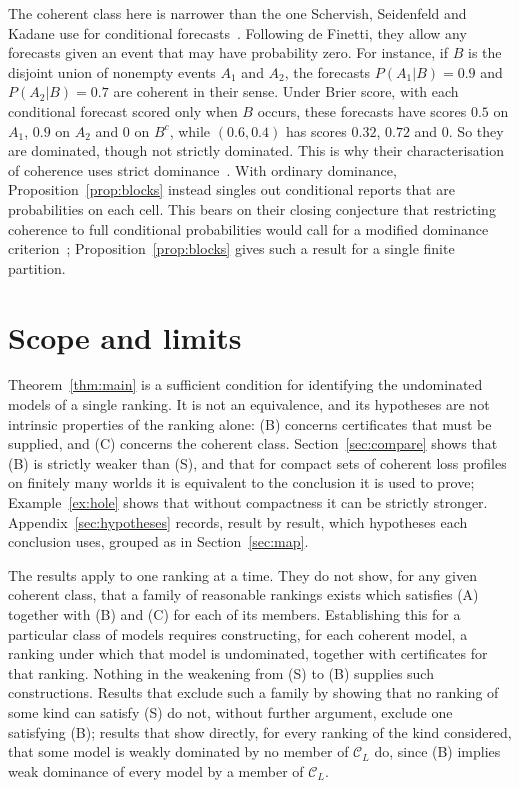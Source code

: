 \documentclass[11pt]{article}
\theoremstyle{definition}
\theoremstyle{remark}
\newcommand{\C}{\mathcal C}
\begin{document}
The coherent class here is narrower than the one Schervish, Seidenfeld and Kadane use for conditional forecasts~\cite{SSK09}. Following de Finetti, they allow any forecasts given an event that may have probability zero. For instance, if $B$ is the disjoint union of nonempty events $A_1$ and $A_2$, the forecasts $P(A_1|B)=0.9$ and $P(A_2|B)=0.7$ are coherent in their sense. Under Brier score, with each conditional forecast scored only when $B$ occurs, these forecasts have scores $0.5$ on $A_1$, $0.9$ on $A_2$ and $0$ on $B^c$, while $(0.6,0.4)$ has scores $0.32$, $0.72$ and $0$. So they are dominated, though not strictly dominated. This is why their characterisation of coherence uses strict dominance~\cite[Theorem~1]{SSK09}. With ordinary dominance, Proposition~\ref{prop:blocks} instead singles out conditional reports that are probabilities on each cell. This bears on their closing conjecture that restricting coherence to full conditional probabilities would call for a modified dominance criterion~\cite[Section~6]{SSK09}; Proposition~\ref{prop:blocks} gives such a result for a single finite partition.


\section{Scope and limits}\label{sec:scope}
Theorem~\ref{thm:main} is a sufficient condition for identifying the undominated models of a single ranking. It is not an equivalence, and its hypotheses are not intrinsic properties of the ranking alone: (B) concerns certificates that must be supplied, and (C) concerns the coherent class. Section~\ref{sec:compare} shows that (B) is strictly weaker than (S), and that for compact sets of coherent loss profiles on finitely many worlds it is equivalent to the conclusion it is used to prove; Example~\ref{ex:hole} shows that without compactness it can be strictly stronger. Appendix~\ref{sec:hypotheses} records, result by result, which hypotheses each conclusion uses, grouped as in Section~\ref{sec:map}.

The results apply to one ranking at a time. They do not show, for any given coherent class, that a family of reasonable rankings exists which satisfies (A) together with (B) and (C) for each of its members. Establishing this for a particular class of models requires constructing, for each coherent model, a ranking under which that model is undominated, together with certificates for that ranking. Nothing in the weakening from (S) to (B) supplies such constructions. Results that exclude such a family by showing that no ranking of some kind can satisfy (S) do not, without further argument, exclude one satisfying (B); results that show directly, for every ranking of the kind considered, that some model is weakly dominated by no member of $\C_L$ do, since (B) implies weak dominance of every model by a member of $\C_L$.
\end{document}
